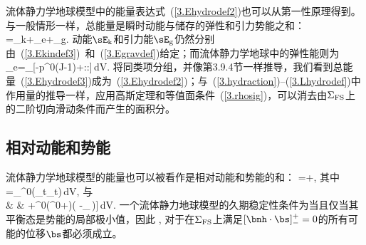 {%
流体静力学地球模型中的能量表达式~(\ref{3.Ehydrodef2})也可以从第一性原理得到。与一般情形一样，总能量是瞬时动能与储存的弹性和引力势能之和：
\eq
\label{3.Ehydrodef3}
\sE=\sE_{\rm k}+\sE_{\rm e}+\sE_{\rm g}.
\en
动能$\sE_{\rm k}$和引力能$\sE_{\rm g}$仍然分别由~(\ref{3.Ekindef3})~和~(\ref{3.Egravdef})给定；而流体静力学地球中的弹性能则为
\eq
\label{3.hydroEgrav}
\sE_{\rm e}=\int_{\subearth}[-p^0(J-1)+\half\beps\!:\!\bGamma\!:\!\beps]\,dV.
\en
将同类项分组，并像第3.9.4节一样推导，我们看到总能量~(\ref{3.Ehydrodef3})成为~(\ref{3.Ehydrodef2})；与~(\ref{3.hydraction})--(\ref{3.Lhydrodef})中作用量的推导一样，应用高斯定理和等值面条件~(\ref{3.rhosig})，可以消去由$\Sigma_{\rm FS}$上的二阶切向滑动条件而产生的面积分。
%
%

\subsection{相对动能和势能}
%
%
%
%
\label{3.sec.last}

流体静力学地球模型的能量也可以被看作是相对动能和势能的和：
\eq
\sE=\sT+\sV,
\en
其中
\eq
\label{3.hydroTdef}
\sT=\half\int_{\subearth}\rho^0(\p_t\bs\cdot\p_t\bs)\,dV,
\en
与
\eqa
\label{3.hydroVdef}
\lefteqn{\sV=\half\int_{\subearth}
[\beps\!:\!\bGamma\!:\!\beps+\rho^0\bs\cdot\bdel\phi^{\rm E1}
+\rho^0\bs\cdot\bdel\bdel(\phi^0+\psi)\cdot\bs} \nonumber \\
& & \mbox{}\qquad\qquad\qquad+\rho^0\bdel(\phi^0+\psi)\cdot(\bs\cdot\bdel\bs
-\bs_{\,}\bdel\cdot\bs)]\,dV.
\ena
一个流体静力地球模型的久期稳定性条件为当且仅当其平衡态是势能的局部极小值，因此
\eq
\sV {},
\en
对于在$\Sigma_{\rm FS}$上满足$[\bnh\cdot\bs]^+_-=0$的所有可能的位移$\bs$都必须成立。

}
